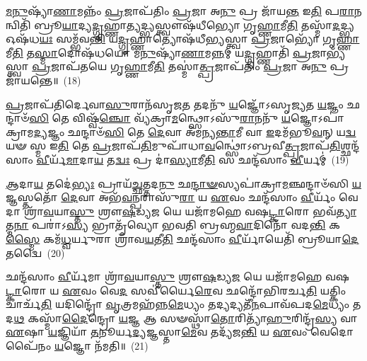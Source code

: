 \-\ul{𑌮}\-\-\ul{𑌨𑍁}\-𑌷𑍍𑌯𑌾᳴\-\ul{𑌣𑌾}\-𑌮𑌨𑍍𑌨𑌂᳴ \ul{𑌪𑍍𑌰}\-𑌜𑌾𑌪᳴𑌤𑌿𑌂 \ul{𑌪𑍍𑌰}\-𑌜𑌾 𑌅\-\ul{𑌨𑍁} 𑌪𑍍𑌰 𑌜𑌾᳴𑌯\-\ul{𑌨𑍍𑌤} 𑌇\-\ul{𑌤𑌿} 𑌪\-\ul{𑌰𑌾}\-𑌨𑌨𑍍𑌵𑌿𑌤𑌿᳴ 𑌬𑍍𑌰𑍂\-\ul{𑌯𑌾}\-𑌦𑍍𑌯\-\ul{𑌦𑍍𑌗𑍃}\-𑌹𑍍𑌣𑌾\-\ul{𑌤𑍍𑌯}\-𑌦𑍍𑌭𑍍𑌯𑌸𑍍𑌤𑍍𑌵𑍗𑌷᳴𑌧𑍀𑌭𑍍𑌯𑍋 𑌗𑍃\-\ul{𑌹𑍍𑌣𑌾}\-𑌮𑍀\-\ul{𑌤𑌿} 𑌤𑌸𑍍𑌮𑌾᳴\-\ul{𑌦}\-𑌦𑍍𑌭𑍍𑌯 𑌓𑌷᳴𑌧\-\ul{𑌯𑌃} 𑌸𑌮𑍍𑌭᳴𑌵\-\ul{𑌨𑍍𑌤𑌿} 𑌯\-\ul{𑌦𑍍𑌗𑍃}\-𑌹𑍍𑌣𑌾𑌤𑍍𑌯𑍋𑌷᳴𑌧𑍀𑌭𑍍𑌯𑌸𑍍𑌤𑍍𑌵𑌾 \ul{𑌪𑍍𑌰}\-𑌜𑌾𑌭𑍍𑌯𑍋᳴ 𑌗𑍃\-\ul{𑌹𑍍𑌣𑌾}\-𑌮𑍀\-\ul{𑌤𑌿} 𑌤\-\ul{𑌸𑍍𑌮𑌾}\-𑌦𑍋𑌷᳴𑌧𑌯𑍋 𑌮\-\ul{𑌨𑍁}\-𑌷𑍍𑌯𑌾᳴\-\ul{𑌣𑌾}\-𑌮\-\ul{𑌨𑍍𑌨}\-𑌮𑍍 𑌯\-\ul{𑌦𑍍𑌗𑍃}\-𑌹𑍍𑌣𑌾𑌤𑌿᳴ \ul{𑌪𑍍𑌰}\-𑌜𑌾𑌭𑍍𑌯᳴𑌸𑍍𑌤𑍍𑌵𑌾 \ul{𑌪𑍍𑌰}\-𑌜𑌾𑌪᳴𑌤𑌯𑍇 𑌗𑍃\-\ul{𑌹𑍍𑌣𑌾}\-𑌮𑍀\-\ul{𑌤𑌿} 𑌤𑌸𑍍𑌮𑌾॑\-\ul{𑌤𑍍𑌪𑍍𑌰}\-𑌜𑌾𑌪᳴𑌤𑌿𑌂 \ul{𑌪𑍍𑌰}\-𑌜𑌾 𑌅\-\ul{𑌨𑍁} 𑌪𑍍𑌰 𑌜𑌾᳴𑌯𑌨𑍍𑌤𑍇॥~(18)

{\anuvakamend[{\-\ul{𑌅}\-𑌭𑌿𑌜𑌿᳴\-\ul{𑌤𑍍𑌯𑌾} 𑌓𑌷᳴𑌧\-\ul{𑌯𑍋}\-\-𑌽𑌷𑍍𑌟𑌾𑌚᳴𑌤𑍍𑌵𑌾𑌰𑌿𑍞𑌶𑌚𑍍𑌚}]}%

\-\ul{𑌪𑍍𑌰}\-𑌜𑌾𑌪᳴𑌤𑌿𑌰𑍍𑌦𑍇𑌵𑌾\-\ul{𑌸𑍁}\-𑌰𑌾𑌨᳴𑌸𑍃𑌜\-\ul{𑌤} 𑌤𑌦𑌨𑍁᳴ \ul{𑌯}\-𑌜𑍍𑌞𑍋᳴\-𑌽𑌸𑍃𑌜𑍍𑌯𑌤 \ul{𑌯}\-𑌜𑍍𑌞𑌂 𑌛𑌨𑍍𑌦𑌾𑍞᳴\-\ul{𑌸𑌿} 𑌤𑍇 𑌵𑌿𑌷𑍍𑌵᳴\-\ul{𑌞𑍍𑌚𑍋} 𑌵𑍍𑌯᳴𑌕𑍍𑌰𑌾\-\ul{𑌮}\-𑌨𑍍𑌥𑍍𑌸𑍋\-𑌽𑌸𑍁᳴\-\ul{𑌰𑌾}\-𑌨𑌨𑍁᳴ \ul{𑌯}\-𑌜𑍍𑌞𑍋\-𑌽𑌪𑌾॑𑌕𑍍𑌰𑌾𑌮\-\ul{𑌦𑍍𑌯}\-𑌜𑍍𑌞𑌂 𑌛𑌨𑍍𑌦𑌾𑍞᳴\-\ul{𑌸𑌿} 𑌤𑍇 \ul{𑌦𑍇}\-𑌵𑌾 𑌅᳴𑌮𑌨𑍍𑌯\-\ul{𑌨𑍍𑌤𑌾}\-𑌮𑍀 𑌵𑌾 \ul{𑌇}\-𑌦𑌮᳴𑌭𑍂\-\ul{𑌵}\-𑌨𑍍 𑌯\-\ul{𑌦𑍍𑌵}\-𑌯𑍟 𑌸𑍍𑌮 𑌇\-\ul{𑌤𑌿} 𑌤𑍇 \ul{𑌪𑍍𑌰}\-𑌜𑌾𑌪᳴\-\ul{𑌤𑌿}\-𑌮𑍁𑌪𑌾᳴𑌧𑌾\-\ul{𑌵}\-𑌨𑍍𑌥𑍍𑌸𑍋॑\-𑌽𑌬𑍍𑌰𑌵𑍀\-\ul{𑌤𑍍𑌪𑍍𑌰}\-𑌜𑌾𑌪᳴\-\ul{𑌤𑌿}\-𑌶𑍍𑌛𑌨𑍍𑌦᳴𑌸𑌾𑌂 \ul{𑌵𑍀}\-𑌰𑍍𑌯᳴\-\ul{𑌮𑌾}\-𑌦𑌾\-\ul{𑌯} 𑌤\-\ul{𑌦𑍍𑌵𑌃} 𑌪𑍍𑌰 𑌦𑌾॑\-\ul{𑌸𑍍𑌯𑌾}\-𑌮𑍀\-\ul{𑌤𑌿} 𑌸 𑌛𑌨𑍍𑌦᳴𑌸𑌾𑌂 \ul{𑌵𑍀}\-𑌰𑍍𑌯𑌮𑍍॑~(19)

\-\ul{𑌆}\-𑌦𑌾\-\ul{𑌯} 𑌤𑌦𑍇॑\-\ul{𑌭𑍍𑌯𑌃} 𑌪𑍍𑌰𑌾𑌯᳴\-\ul{𑌚𑍍𑌛}\-𑌤𑍍𑌤𑌦\-\ul{𑌨𑍁} 𑌛\-\ul{𑌨𑍍𑌦𑌾}\-\-\ul{𑍟}\-𑌸𑍍𑌯𑌪𑌾॑𑌕𑍍𑌰𑌾\-\ul{𑌮}\-𑌞𑍍𑌛𑌨𑍍𑌦𑌾𑍞᳴𑌸𑌿 \ul{𑌯}\-𑌜𑍍𑌞𑌸𑍍𑌤𑌤𑍋᳴ \ul{𑌦𑍇}\-𑌵𑌾 𑌅𑌭᳴\-\ul{𑌵}\-𑌨𑍍𑌪𑌰𑌾𑌸𑍁᳴\-\ul{𑌰𑌾} 𑌯 \ul{𑌏}\-𑌵𑌂 𑌛𑌨𑍍𑌦᳴𑌸𑌾𑌂 \ul{𑌵𑍀}\-𑌰𑍍𑌯𑌂᳴ 𑌵𑍇𑌦𑌾 𑌶𑍍𑌰𑌾᳴\-\ul{𑌵}\-𑌯𑌾\-\ul{𑌸𑍍𑌤𑍁} 𑌶𑍍𑌰𑍗\-\ul{𑌷}\-𑌡𑍍𑌯\-\ul{𑌜} 𑌯𑍇 𑌯𑌜𑌾᳴𑌮𑌹𑍇 𑌵𑌷\-\ul{𑌟𑍍𑌕𑌾}\-𑌰𑍋 𑌭𑌵᳴\-\ul{𑌤𑍍𑌯𑌾}\-𑌤𑍍𑌮\-\ul{𑌨𑌾} 𑌪𑌰𑌾॑\-𑌽\-\ul{𑌸𑍍𑌯} 𑌭𑍍𑌰𑌾𑌤𑍃᳴𑌵𑍍𑌯𑍋 𑌭𑌵𑌤𑌿 𑌬𑍍𑌰𑌹𑍍𑌮\-\ul{𑌵𑌾}\-𑌦𑌿𑌨𑍋᳴ 𑌵𑌦\-\ul{𑌨𑍍𑌤𑌿} 𑌕\-\ul{𑌸𑍍𑌮𑍈} 𑌕𑌮᳴\-\ul{𑌧𑍍𑌵}\-𑌰𑍍𑌯𑍁𑌰𑌾 𑌶𑍍𑌰𑌾᳴𑌵\-\ul{𑌯}\-𑌤𑍀\-\ul{𑌤𑌿} 𑌛𑌨𑍍𑌦᳴𑌸𑌾𑌂 \ul{𑌵𑍀}\-𑌰𑍍𑌯𑌾᳴𑌯𑍇𑌤𑌿᳴ 𑌬𑍍𑌰𑍂𑌯𑌾\-\ul{𑌦𑍇}\-𑌤𑌦𑍍𑌵𑍈~(20)

𑌛𑌨𑍍𑌦᳴𑌸𑌾𑌂 \ul{𑌵𑍀}\-𑌰𑍍𑌯᳴𑌮𑌾 𑌶𑍍𑌰𑌾᳴\-\ul{𑌵}\-𑌯𑌾\-\ul{𑌸𑍍𑌤𑍁} 𑌶𑍍𑌰𑍗\-\ul{𑌷}\-𑌡𑍍𑌯\-\ul{𑌜} 𑌯𑍇 𑌯𑌜𑌾᳴𑌮𑌹𑍇 𑌵𑌷\-\ul{𑌟𑍍𑌕𑌾}\-𑌰𑍋 𑌯 \ul{𑌏}\-𑌵𑌂 𑌵𑍇\-\ul{𑌦} 𑌸𑌵𑍀॑𑌰𑍍𑌯𑍈\-\ul{𑌰𑍇}\-𑌵 𑌛𑌨𑍍𑌦𑍋᳴𑌭𑌿𑌰𑌰𑍍𑌚\-\ul{𑌤𑌿} 𑌯𑌤𑍍𑌕𑌿𑌂 𑌚𑌾𑌰𑍍𑌚᳴\-\ul{𑌤𑌿} 𑌯𑌦𑌿𑌨𑍍𑌦𑍍𑌰𑍋᳴ \ul{𑌵𑍃}\-𑌤𑍍𑌰𑌮𑌹᳴𑌨𑍍𑌨\-\ul{𑌮𑍇}\-𑌧𑍍𑌯𑌂 𑌤𑌦𑍍𑌯𑌦𑍍𑌯𑌤𑍀᳴\-\ul{𑌨}\-𑌪𑌾𑌵᳴𑌪𑌦\-\ul{𑌮𑍇}\-𑌧𑍍𑌯𑌂 𑌤𑌦\-\ul{𑌥} 𑌕𑌸𑍍𑌮𑌾᳴\-\ul{𑌦𑍈}\-𑌨𑍍𑌦𑍍𑌰𑍋 \ul{𑌯}\-𑌜𑍍𑌞 𑌆 𑌸𑍟𑌸𑍍𑌥𑌾᳴\-\ul{𑌤𑍋}\-𑌰𑌿𑌤𑍍𑌯𑌾᳴\-\ul{𑌹𑍁}\-𑌰𑌿𑌨𑍍𑌦𑍍𑌰᳴\-\ul{𑌸𑍍𑌯} 𑌵𑌾 \ul{𑌏}\-𑌷𑌾 \ul{𑌯}\-𑌜𑍍𑌞𑌿𑌯𑌾᳴ \ul{𑌤}\-𑌨𑍂𑌰𑍍𑌯\-\ul{𑌦𑍍𑌯}\-𑌜𑍍𑌞𑌸𑍍𑌤𑌾\-\ul{𑌮𑍇}\-𑌵 𑌤𑌦𑍍𑌯᳴𑌜\-\ul{𑌨𑍍𑌤𑌿} 𑌯 \ul{𑌏}\-𑌵𑌂 𑌵𑍇𑌦𑍋𑌪𑍈᳴𑌨𑌂 \ul{𑌯}\-𑌜𑍍𑌞𑍋 𑌨᳴𑌮𑌤𑌿॥~(21)

{\anuvakamend[{𑌸 𑌛𑌨𑍍𑌦᳴𑌸𑌾𑌂 \ul{𑌵𑍀}\-𑌰𑍍𑌯𑌂᳴ 𑌵𑌾 \ul{𑌏}\-𑌵 𑌤\-\ul{𑌦}\-𑌷𑍍𑌟𑍗 𑌚᳴}]}%

